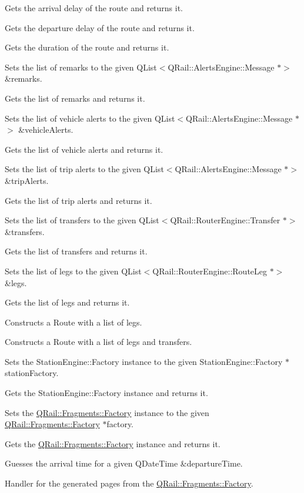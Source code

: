 Gets the arrival delay of the route and returns it.

Gets the departure delay of the route and returns it.

Gets the duration of the route and returns it.

Sets the list of remarks to the given Q\+List$<$\+Q\+Rail\+::\+Alerts\+Engine\+::\+Message $\ast$$>$ \&remarks.

Gets the list of remarks and returns it.

Sets the list of vehicle alerts to the given Q\+List$<$\+Q\+Rail\+::\+Alerts\+Engine\+::\+Message $\ast$$>$ \&vehicle\+Alerts.

Gets the list of vehicle alerts and returns it.

Sets the list of trip alerts to the given Q\+List$<$\+Q\+Rail\+::\+Alerts\+Engine\+::\+Message $\ast$$>$ \&trip\+Alerts.

Gets the list of trip alerts and returns it.

Sets the list of transfers to the given Q\+List$<$\+Q\+Rail\+::\+Router\+Engine\+::\+Transfer $\ast$$>$ \&transfers.

Gets the list of transfers and returns it.

Sets the list of legs to the given Q\+List$<$\+Q\+Rail\+::\+Router\+Engine\+::\+Route\+Leg $\ast$$>$ \&legs.

Gets the list of legs and returns it.

Constructs a Route with a list of legs.

Constructs a Route with a list of legs and transfers.

Sets the Station\+Engine\+::\+Factory instance to the given Station\+Engine\+::\+Factory $\ast$station\+Factory.

Gets the Station\+Engine\+::\+Factory instance and returns it.

Sets the \mbox{\hyperlink{classQRail_1_1Fragments_1_1Factory}{Q\+Rail\+::\+Fragments\+::\+Factory}} instance to the given \mbox{\hyperlink{classQRail_1_1Fragments_1_1Factory}{Q\+Rail\+::\+Fragments\+::\+Factory}} $\ast$factory.

Gets the \mbox{\hyperlink{classQRail_1_1Fragments_1_1Factory}{Q\+Rail\+::\+Fragments\+::\+Factory}} instance and returns it.

Guesses the arrival time for a given Q\+Date\+Time \&departure\+Time.

Handler for the generated pages from the \mbox{\hyperlink{classQRail_1_1Fragments_1_1Factory}{Q\+Rail\+::\+Fragments\+::\+Factory}}.

